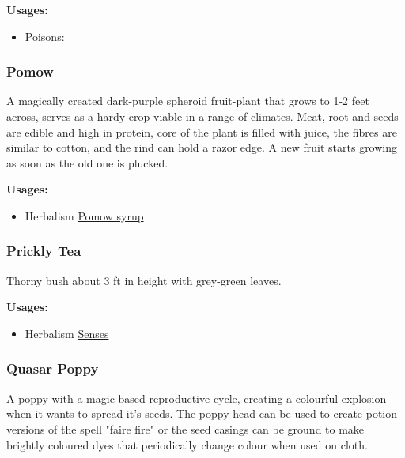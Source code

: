 \vspace{5mm}

\textbf{Usages:}

\begin{itemize}[noitemsep]
\item[] Poisons: \poison
\end{itemize}

\subsubsection{Pomow}
\label{Pomow}

A magically created dark-purple spheroid fruit-plant that grows to 1-2 feet across, serves as a hardy crop viable in a range of climates. Meat, root and seeds are edible and high in protein, core of the plant is filled with juice, the fibres are similar to cotton, and the rind can hold a razor edge. A new fruit starts growing as soon as the old one is plucked.

\vspace{5mm}

\textbf{Usages:}

\begin{itemize}[noitemsep]
\item[] Herbalism \hyperref[Pomow syrup]{Pomow syrup}
\end{itemize}

\subsubsection{Prickly Tea}
\label{Prickly Tea}

Thorny bush about 3 ft in height with grey-green leaves.

\vspace{5mm}

\textbf{Usages:}

\begin{itemize}[noitemsep]
\item[] Herbalism \hyperref[Senses]{Senses}
\end{itemize}

\subsubsection{Quasar Poppy}
\label{quasar_poppy}

A poppy with a magic based reproductive cycle, creating a colourful explosion when it wants to spread it's seeds. The poppy head can be used to create potion versions of the spell "faire fire" or the seed casings can be ground to make brightly coloured dyes that periodically change colour when used on cloth.

